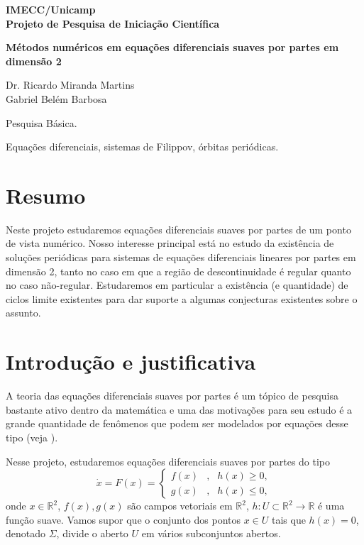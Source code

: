 \documentclass[12pt]{article}
\begin{document}
\fontsize{14}{18} \selectfont 


\begin{center}
{\bf IMECC/Unicamp}\\
{\bf Projeto de Pesquisa de Iniciação Científica}\\

\vspace{.5cm}

{\bf\Large Métodos numéricos em equações diferenciais suaves por partes em dimensão 2}
\end{center}

\vspace{1cm}

 Dr. Ricardo Miranda Martins\\
  Gabriel Belém Barbosa\\

\medskip
 
 Pesquisa Básica.

 Equações diferenciais, sistemas de Filippov, órbitas periódicas.


\section*{Resumo}

Neste projeto estudaremos equações diferenciais suaves por partes de um ponto de vista numérico. Nosso interesse principal está no estudo da existência de soluções periódicas para sistemas de equações diferenciais lineares por partes em dimensão 2, tanto no caso em que a região de descontinuidade é regular quanto no caso não-regular. Estudaremos em particular a existência (e quantidade) de ciclos limite existentes para dar suporte a algumas conjecturas existentes sobre o assunto.


\section{Introdução e justificativa}

A teoria das equações diferenciais suaves por partes é um tópico de pesquisa bastante ativo dentro da matemática e uma das motivações para seu estudo é a grande quantidade de fenômenos que podem ser modelados por equações desse tipo (veja \cite{diBernardo-livro,survey}).

Nesse projeto, estudaremos equações diferenciais suaves por partes do tipo
\[\dot x=F(x)=\left\{\begin{array}{lcl}
f(x)&,&h(x)\geq 0,\\
g(x)&,&h(x)\leq 0,
\end{array}\right.
\]
onde $x\in\mathbb R^2$, $f(x),g(x)$ são campos vetoriais em $\mathbb R^2$, $h:U\subset\mathbb R^2\rightarrow\mathbb R$ é uma função suave. Vamos supor que o conjunto dos pontos $x\in U$ tais que $h(x)=0$, denotado $\Sigma$, divide o aberto $U$ em vários subconjuntos abertos.
\end{document}
